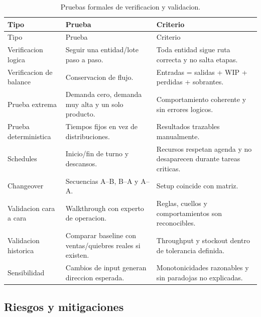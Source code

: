\documentclass[12pt]{article}
\begin{document}
\begin{longtable}{L{3.2cm}L{5.1cm}L{6.1cm}}
\caption{Pruebas formales de verificacion y validacion.}\\
\toprule
{}
\color{white}Tipo & \color{white}Prueba & \color{white}Criterio \\
\midrule
\endfirsthead
\toprule
{}
\color{white}Tipo & \color{white}Prueba & \color{white}Criterio \\
\midrule
\endhead
Verificacion logica & Seguir una entidad/lote paso a paso. & Toda entidad sigue ruta correcta y no salta etapas. \\
Verificacion de balance & Conservacion de flujo. & Entradas = salidas + WIP + perdidas + sobrantes. \\
Prueba extrema & Demanda cero, demanda muy alta y un solo producto. & Comportamiento coherente y sin errores logicos. \\
Prueba deterministica & Tiempos fijos en vez de distribuciones. & Resultados trazables manualmente. \\
Schedules & Inicio/fin de turno y descansos. & Recursos respetan agenda y no desaparecen durante tareas criticas. \\
Changeover & Secuencias A--B, B--A y A--A. & Setup coincide con matriz. \\
Validacion cara a cara & Walkthrough con experto de operacion. & Reglas, cuellos y comportamientos son reconocibles. \\
Validacion historica & Comparar baseline con ventas/quiebres reales si existen. & Throughput y stockout dentro de tolerancia definida. \\
Sensibilidad & Cambios de input generan direccion esperada. & Monotonicidades razonables y sin paradojas no explicadas. \\
\bottomrule
\end{longtable}

\subsection{Riesgos y mitigaciones}
\end{document}
